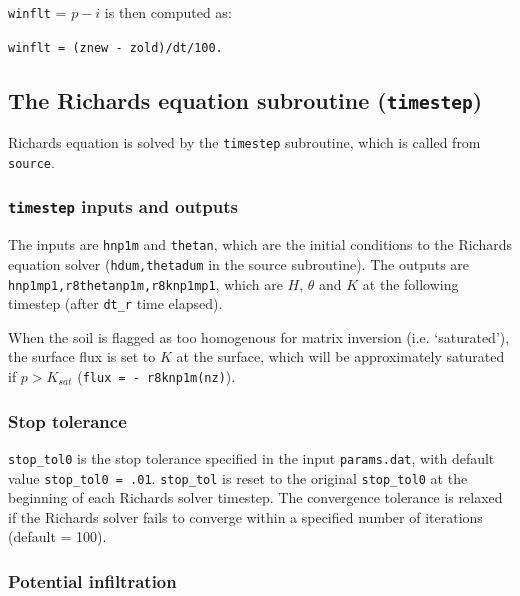 \documentclass{article}
\newcommand{\code}[1]{\texttt{#1}}
\begin{document}
 \code{winflt} = $p-i$  is then computed as:
\begin{center}
 \code{winflt = (znew - zold)/dt/100.} 	
\end{center}

	
 

\subsection{The Richards equation subroutine (\code{timestep}) }

Richards equation is solved by the \code{timestep} subroutine, which is called from \code{source}.
	
\subsubsection*{\code{timestep} inputs and outputs }
The inputs are \code{hnp1m} and \code{thetan}, which are the initial conditions to the Richards equation solver (\code{hdum,thetadum} in the source subroutine).  
The outputs are  \code{hnp1mp1,r8thetanp1m,r8knp1mp1}, which are  $H$, $\theta$ and $K$ at the following timestep (after \code{dt\_r}  time elapsed).



When the soil is flagged as too homogenous for matrix inversion (i.e. `saturated'),  the surface flux is set to $K$ at the surface, which will be approximately saturated if $p > K_{sat}$ (\code{flux  = - r8knp1m(nz)}).  

\subsubsection*{Stop tolerance }
\code{stop\_tol0} is the stop tolerance specified in the input \code{params.dat}, with default value \code{stop\_tol0 = .01}.  
\code{stop\_tol} is reset to the original \code{stop\_tol0}  at the beginning of each Richards solver timestep.  The convergence tolerance  is relaxed if the Richards solver fails to converge within a specified number of iterations (default = 100).



\subsubsection*{Potential infiltration}
\end{document}
